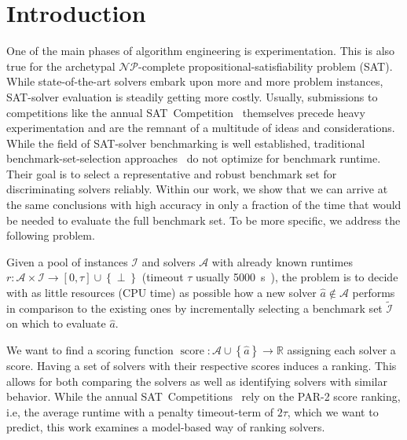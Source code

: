 \documentclass[runningheads]{llncs}
\begin{document}
\section{Introduction}
\label{sec:intro}
One of the main phases of algorithm engineering is experimentation.
This is al\-so true for the archetypal $\mathcal{NP}$-complete pro\-po\-si\-tio\-nal-sat\-is\-fia\-bi\-li\-ty problem (SAT).
While state-of-the-art solvers embark upon more and more problem instances, SAT-solver evaluation is steadily getting more costly.
Usually, submissions to competitions like the annual SAT~Competition~\cite{FroleyksHIJS21} themselves precede heavy experimentation and are the remnant of a multitude of ideas and considerations.
While the field of SAT-solver benchmarking is well established, traditional benchmark-set-selection approaches~\cite{Gelder11,HoosKSS13} do not optimize for benchmark runtime.
Their goal is to select a representative and robust benchmark set for discriminating solvers reliably.
Within our work, we show that we can arrive at the same conclusions with high accuracy in only a fraction of the time that would be needed to evaluate the full benchmark set.
To be more specific, we address the following problem.

\begin{definition}
	Given a pool of instances $\mathcal{I}$ and solvers $\mathcal{A}$ with already known runtimes $r\!: \mathcal{A} \times \mathcal{I} \rightarrow \left[0, \tau\right] \cup \left\lbrace \perp \right\rbrace$ (timeout $\tau$ usually \SI{5000}{s}~\cite{FroleyksHIJS21}), the problem is to decide with as little resources (CPU time) as possible how a new solver $\hat{a} \notin \mathcal{A}$ performs in comparison to the existing ones by incrementally selecting a benchmark set $\tilde{\mathcal{I}}$ on which to evaluate $\hat{a}$.
\end{definition}

We want to find a scoring function $\operatorname{score}\!: \mathcal{A} \cup \left\lbrace \hat{a} \right\rbrace \rightarrow \mathbb{R}$ assigning each solver a score.
Having a set of solvers with their respective scores induces a ranking.
This allows for both comparing the solvers as well as identifying solvers with similar behavior.
While the annual SAT~Competitions~\cite{FroleyksHIJS21} rely on the PAR-2 score ranking, i.e, the average runtime with a penalty timeout-term of $2\tau$, which we want to predict, this work examines a model-based way of ranking solvers.
\end{document}
